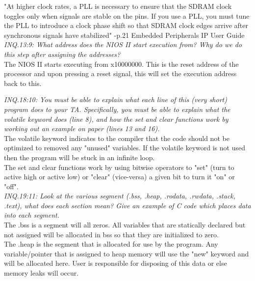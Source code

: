 \documentclass[journal, twocolumn, final,11pt,letterpaper]{IEEEtran}
\begin{document}
 "At higher clock rates, a PLL is necessary to ensure that the SDRAM clock toggles only when signals are stable on the pins. If you use a PLL, you must tune the PLL to introduce a clock phase shift so that SDRAM clock edges
 arrive after synchronous signals have stabilized" -p.21 Embedded Peripherals IP User Guide \\


\textit{INQ.13:9: What address does the NIOS II start execution from? Why do we do this step after assigning the addresses?}  \\

The NIOS II starts executing from x10000000. This is the reset address of the processor and upon pressing a reset signal, this will set the execution address back to this.



\textit{INQ.18:10: You must be able to explain what each line of this (very short) program does to your TA. Specifically, you must be able to explain what the volatile keyword does (line 8), and how the set and clear functions work by working out an example on paper (lines 13 and 16).} \\

The volatile keyword indicates to the compiler that the code should not be optimized to removed any "unused" variables. If the volatile keyword is not used then the program will be stuck in an infinite loop.\\

The set and clear functions work by using bitwise operators to "set" (turn to active high or active low) or "clear" (vice-versa) a given bit to turn it "on" or "off".\\

\textit{INQ.19:11: Look at the various segment (.bss, .heap, .rodata, .rwdata, .stack, .text), what does each section mean? Give an example of C code which places data into each segment.} \\

The .bss is a segment will all zeros. All variables that are statically declared but not assigned will be allocated in bss so that they are initialized to zero.\\

The .heap is the segment that is allocated for use by the program. Any variable/pointer that is assigned to heap memory will use the "new" keyword and will be allocated here. User is responsible for disposing of this data or else memory leaks will occur.\\
\end{document}

